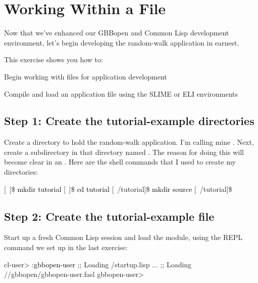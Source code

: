 \documentclass[10pt,twoside,english,pdftex]{article}
\begin{document}

\T\markright{}%
\T\pagestyle{plain}
\T\cleardoublepage
\W{}
\T\pagestyle{fancy}
\T\thispagestyle{fancybottom}
\T\renewcommand{\headrulewidth}{0pt}
\section{Working Within a File}
\label{sec:file}%

Now that we've enhanced our GBBopen and Common Lisp development environment,
let's begin developing the random-walk application in earnest.

\fndocrule

This exercise shows you how to:
\begin{tightitemize}
\item Begin working with files for application development
\item Compile and load an application file using the SLIME or ELI
  environments
\end{tightitemize}

\fndocrule

\subsection*{Step 1: Create the tutorial-example directories}

Create a directory to hold the random-walk application.  I'm calling mine
.  Next, create a subdirectory in that directory named
.  The reason for doing this will become clear in an
. Here are the shell commands
that I used to create my directories:
%
\W\supp
\begin{example}
\textcolor{darkergray}{%
  [~]\$ \textcolor{black}{mkdir tutorial}
  [~]\$ \textcolor{black}{cd tutorial}
  [~/tutorial]\$ \textcolor{black}{mkdir source}
  [~/tutorial]\$}
\end{example}

\subsection*{Step 2: Create the tutorial-example file}

Start up a fresh Common Lisp session and load the 
module, using the REPL command we set up in the last exercise:
%
\W\supp
\begin{example}
\textcolor{darkergray}{%
  cl-user> \textcolor{black}{:gbbopen-user}
  ;; Loading /startup.lisp
     ...
  ;; Loading //gbbopen/gbbopen-user.fasl
  gbbopen-user>}
\end{example}
\end{document}

